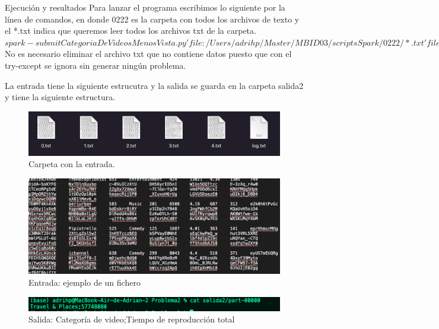 \documentclass[a4paper]{article}
\begin{document}
\clearpage
\begin{section}{Ejecución y resultados}
    Para lanzar el programa escribimos lo siguiente por la línea de comandos, en donde 0222 es la carpeta con todos los archivos de texto y el *.txt indica que queremos leer todos los archivos txt de la carpeta.
    $spark-submit CategoriaDeVideosMenosVista.py 'file:/Users/adrihp/Master/MBID03/scriptsSpark/0222/*.txt' file:/Users/adrihp/Master/MBID03/scriptsSpark/salida2$
    No es necesario eliminar el archivo txt que no contiene datos puesto que con el try-except se ignora sin generar ningún problema.
    
    La entrada tiene la siguiente estrucutra y la salida se guarda en la carpeta salida2 y tiene la siguiente estructura.
    \begin{figure}[h]
        \centering
        \includegraphics[width=\textwidth, keepaspectratio]{entrada21.png}
        \caption{Carpeta con la entrada.}

    \end{figure}
    \begin{figure}[h]
        \centering
        \includegraphics[width=\textwidth, keepaspectratio]{entrada2.png}
        \caption{Entrada: ejemplo de un fichero}

    \end{figure}
    \begin{figure}[h]
        \centering
        \includegraphics[width=\textwidth, keepaspectratio]{salida2.png}
        \caption{Salida: Categoría de video;Tiempo de reproducción total}

    \end{figure}
\end{section}
\end{document}
